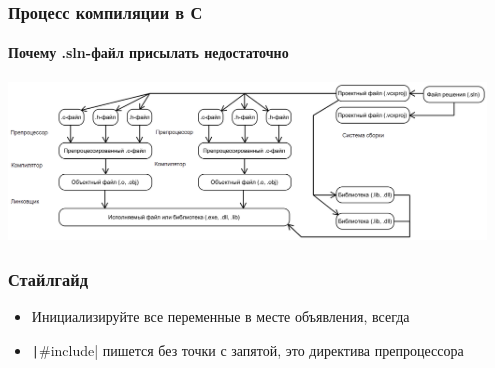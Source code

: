 \documentclass{../../slides-style}
\begin{document}
    
    \begin{frame}[plain]
        \titlepage
    \end{frame}
    
    \begin{frame}
        \frametitle{Процесс компиляции в С}
        \framesubtitle{Почему .sln-файл присылать недостаточно}
        \begin{center}
            \includegraphics[width=0.95\textwidth]{compilation.png}
        \end{center}
    \end{frame}

    \begin{frame}[fragile]
        \frametitle{Стайлгайд}
        \begin{itemize}
            \item Инициализируйте все переменные в месте объявления, всегда
            \item \texttt|#include| пишется без точки с запятой, это директива препроцессора
        \end{itemize}
    \end{frame}
\end{document}
